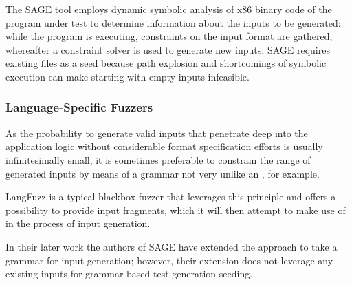 The SAGE\cite{godefroid-sage} tool employs dynamic symbolic analysis of x86 binary code of the program under
test to determine information about the inputs to be generated: while the program is executing, constraints on
the input format are gathered, whereafter a constraint solver is used to generate new inputs. SAGE requires
existing files as a seed because path explosion and shortcomings of symbolic execution can make starting with
empty inputs infeasible.

\tocless\subsubsection{Language-Specific Fuzzers}
As the probability to generate valid inputs that penetrate deep into the application logic without considerable
format specification efforts is usually infinitesimally small, it is sometimes preferable to constrain the
range of generated inputs by means of a grammar not very unlike an \xsd, for example.

LangFuzz\cite{holler2012} is a typical blackbox fuzzer that leverages this principle and offers a possibility
to provide input fragments, which it will then attempt to make use of in the process of input generation.

In their later work \cite{Godefroid:2008:GWF:1375581.1375607} the authors of SAGE have extended the approach to
take a grammar for input generation; however, their extension does not leverage any existing inputs for
grammar-based test generation seeding.
